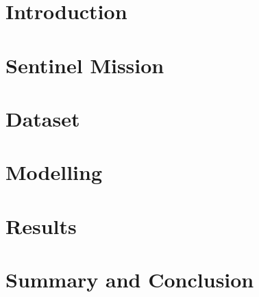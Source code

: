 \documentclass[12pt, a4paper]{report}
\begin{document}





\tableofcontents

\chapter{Introduction}


\chapter{Sentinel Mission}


\chapter{Dataset} \label{chap:Dataset}


\chapter{Modelling}


\chapter{Results}


\chapter{Summary and Conclusion}




\end{document}
